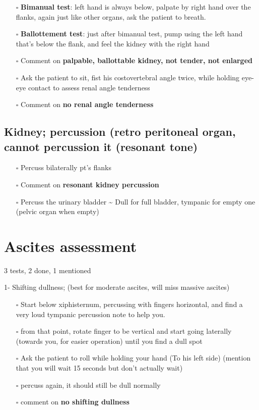 \documentclass[
  13.5pt,
  a4paper,
  DIV=11,
  numbers=noendperiod]{scrreprt}
\providecommand{\tightlist}{%
  \setlength{\itemsep}{0pt}\setlength{\parskip}{0pt}}
\begin{document}
\begin{itemize}
\tightlist
\item[$\square$]
  \textbf{Bimanual test}: left hand is always below, palpate by right
  hand over the flanks, again just like other organs, ask the patient to
  breath.
\item[$\square$]
  \textbf{Ballottement test}: just after bimanual test, pump using the
  left hand that's below the flank, and feel the kidney with the right
  hand
\item[$\square$]
  Comment on \textbf{palpable, ballottable kidney, not tender, not
  enlarged}
\item[$\square$]
  Ask the patient to sit, fist his costovertebral angle twice, while
  holding eye-eye contact to assess renal angle tenderness
\item[$\square$]
  Comment on \textbf{no renal angle tenderness}
\end{itemize}

\subsection{Kidney; percussion (retro peritoneal organ, cannot
percussion it (resonant
tone)}\label{kidney-percussion-retro-peritoneal-organ-cannot-percussion-it-resonant-tone}

\begin{itemize}
\tightlist
\item[$\square$]
  Percuss bilaterally pt's flanks
\item[$\square$]
  Comment on \textbf{resonant kidney percussion}
\item[$\square$]
  Percuss the urinary bladder \textasciitilde{} Dull for full bladder,
  tympanic for empty one (pelvic organ when empty)
\end{itemize}

\section{Ascites assessment}\label{ascites-assessment}

3 tests, 2 done, 1 mentioned

1- Shifting dullness; (best for moderate ascites, will miss massive
ascites)

\begin{itemize}
\tightlist
\item[$\square$]
  Start below xiphisternum, percussing with fingers horizontal, and find
  a very loud tympanic percussion note to help you.
\item[$\square$]
  from that point, rotate finger to be vertical and start going
  laterally (towards you, for easier operation) until you find a dull
  spot
\item[$\square$]
  Ask the patient to roll while holding your hand (To his left side)
  (mention that you will wait 15 seconds but don't actually wait)
\item[$\square$]
  percuss again, it should still be dull normally
\item[$\square$]
  comment on \textbf{no shifting dullness}
\end{itemize}
\end{document}

